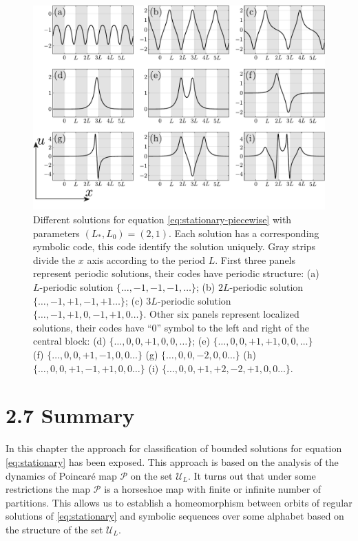 \pagebreak
\begin{figure}[h]
\centering
	\includegraphics[scale = 1]{pic/solutions for piecewise equation}
	\caption{
		Different solutions for equation \eqref{eq:stationary-piecewise} with parameters $(L_*, L_0) = (2, 1)$.
		Each solution has a corresponding symbolic code, this code identify the solution uniquely.
		Gray strips divide the $x$ axis according to the period $L$.
		First three panels represent periodic solutions, their codes have periodic structure: (a) $L$-periodic solution $\{ \dots, -1, -1, -1, \dots \}$; (b) $2L$-periodic solution $\{ \dots, -1, +1, -1, +1 \dots \}$; (c) $3L$-periodic solution $\{ \dots, -1, +1, 0, -1, +1, 0 \dots \}$.
		Other six panels represent localized solutions, their codes have ``$0$'' symbol to the left and right of the central block: (d) $\{ \dots, 0, 0, +1, 0, 0, \dots \}$; (e) $\{ \dots, 0, 0, +1, +1, 0, 0, \dots \}$ (f) $\{ \dots, 0, 0, +1, -1, 0, 0 \dots \}$ (g) $\{ \dots, 0, 0, -2, 0, 0 \dots \}$ (h) $\{ \dots, 0, 0, +1, -1, +1, 0, 0 \dots \}$ (i) $\{ \dots, 0, 0, +1, +2, -2, +1, 0, 0 \dots \}$.
	}
\label{fig:solutions-piecewise}
\end{figure}

\pagebreak
\section*{2.7 Summary}

In this chapter the approach for classification of bounded solutions for equation \eqref{eq:stationary} has been exposed.
This approach is based on the analysis of the dynamics of Poincar\'e map $\mathcal{P}$ on the set $\mathscr{U}_L$.
It turns out that under some restrictions the map $\mathcal{P}$ is a horseshoe map with finite or infinite number of partitions.
This allows us to establish a homeomorphism between orbits of regular solutions of \eqref{eq:stationary} and symbolic sequences over some alphabet based on the structure of the set $\mathscr{U}_L$.


